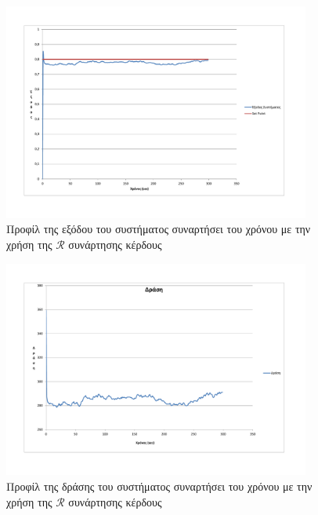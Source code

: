 \documentclass[11pt]{article} %
\numberwithin{equation}{subsection}
\begin{document}
\begin{figure}[H]
    \centering
    \includegraphics[width=0.9\textwidth]{siso_output_2_rewards.pdf}
    \caption{Προφίλ της εξόδου του συστήματος συναρτήσει του χρόνου με την χρήση της $\mathcal{R}$ συνάρτησης κέρδους}
    \label{fig:siso_output_2_rewards}
\end{figure}

\begin{figure}[H]
    \centering
    \includegraphics[width=0.9\textwidth]{action_output_2_reward.pdf}
    \caption{Προφίλ της δράσης του συστήματος συναρτήσει του χρόνου με την χρήση της $\mathcal{R}$ συνάρτησης κέρδους}
    \label{fig:action_output_2_rewards}
\end{figure}
 
\end{document}
